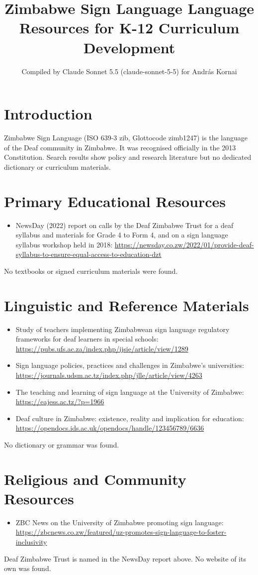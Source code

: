 \documentclass[12pt]{article}
\title{Zimbabwe Sign Language Language Resources for K-12 Curriculum Development}
\author{Compiled by Claude Sonnet 5.5 (claude-sonnet-5-5) for Andr\'as Kornai}
\date{}
\begin{document}
\maketitle

\section{Introduction}
Zimbabwe Sign Language (ISO 639-3 zib, Glottocode zimb1247) is the language of the Deaf community in Zimbabwe. It was recognised officially in the 2013 Constitution. Search results show policy and research literature but no dedicated dictionary or curriculum materials.

\section{Primary Educational Resources}
\begin{itemize}
\item NewsDay (2022) report on calls by the Deaf Zimbabwe Trust for a deaf syllabus and materials for Grade 4 to Form 4, and on a sign language syllabus workshop held in 2018: \url{https://newsday.co.zw/2022/01/provide-deaf-syllabus-to-ensure-equal-access-to-education-dzt}
\end{itemize}
No textbooks or signed curriculum materials were found.

\section{Linguistic and Reference Materials}
\begin{itemize}
\item Study of teachers implementing Zimbabwean sign language regulatory frameworks for deaf learners in special schools: \url{https://pubs.ufs.ac.za/index.php/ijsie/article/view/1289}
\item Sign language policies, practices and challenges in Zimbabwe's universities: \url{https://journals.udsm.ac.tz/index.php/jlle/article/view/4263}
\item The teaching and learning of sign language at the University of Zimbabwe: \url{https://eajess.ac.tz/?p=1966}
\item Deaf culture in Zimbabwe: existence, reality and implication for education: \url{https://opendocs.ids.ac.uk/opendocs/handle/123456789/6636}
\end{itemize}
No dictionary or grammar was found.

\section{Religious and Community Resources}
\begin{itemize}
\item ZBC News on the University of Zimbabwe promoting sign language: \url{https://zbcnews.co.zw/featured/uz-promotes-sign-language-to-foster-inclusivity}
\end{itemize}
Deaf Zimbabwe Trust is named in the NewsDay report above. No website of its own was found.
\end{document}
